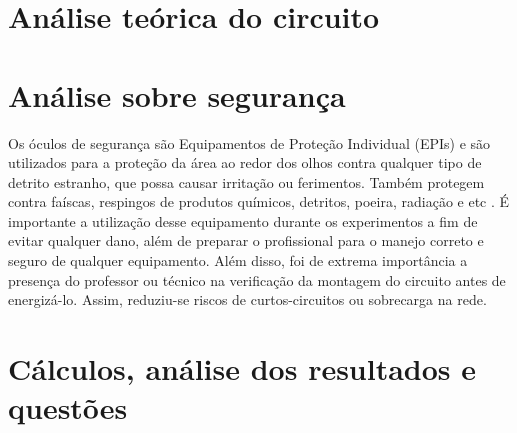 \documentclass[a4paper,12pt,oneside,openany,table,xcdraw]{article}
\begin{document}
\begin{table}[H]
\centering
\caption{Dados experimentais referentes à primeira montagem: carga em estrela com neutro conectado.}
\label{m1:dados:abc}
\end{table}

\section{Análise teórica do circuito}


\section{Análise sobre segurança} %
Os óculos de segurança são Equipamentos de Proteção Individual (EPIs) e são utilizados para a proteção da área ao redor dos olhos contra qualquer tipo de detrito estranho, que possa causar irritação ou ferimentos. Também protegem contra faíscas, respingos de produtos químicos, detritos, poeira, radiação e etc \cite{safe}.
É importante a utilização desse equipamento durante os experimentos a fim de evitar qualquer dano, além de preparar o profissional para o manejo correto e seguro de qualquer equipamento.
Além disso, foi de extrema importância a presença do professor ou técnico na verificação da montagem do circuito antes de energizá-lo. Assim, reduziu-se riscos de curtos-circuitos ou sobrecarga na rede.


\section{Cálculos, análise dos resultados e questões} %
\end{document}
